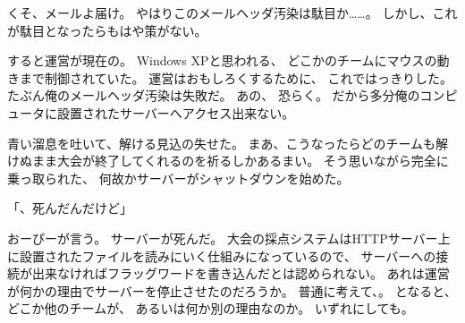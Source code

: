 くそ、メールよ届け。
やはりこのメールヘッダ汚染は駄目か……。
しかし、これが駄目となったらもはや策がない。

すると運営が現在の。
Windows XPと思われる、
どこかのチームにマウスの動きまで制御されていた。
運営はおもしろくするために、
これではっきりした。
たぶん俺のメールヘッダ汚染は失敗だ。
あの、
恐らく。
だから多分俺のコンピュータに設置されたサーバーへアクセス出来ない。

青い溜息を吐いて、解ける見込の失せた。
まあ、こうなったらどのチームも解けぬまま大会が終了してくれるのを祈るしかあるまい。
そう思いながら完全に乗っ取られた、
何故かサーバーがシャットダウンを始めた。

「\Jupiter、死んだんだけど」

おーぴーが言う。
サーバーが死んだ。
大会の採点システムはHTTPサーバー上に設置されたファイルを読みにいく仕組みになっているので、
サーバーへの接続が出来なければフラッグワードを書き込んだとは認められない。
あれは運営が何かの理由でサーバーを停止させたのだろうか。
普通に考えて、。
となると、どこか他のチームが、
あるいは何か別の理由なのか。
いずれにしても。


